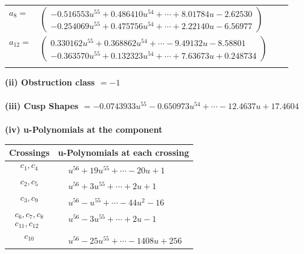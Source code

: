 \documentclass[1p]{elsarticle_modified}
\theoremstyle{definition}
\begin{document}
\begin{tabular}{m{7pt} m{180pt} m{7pt} m{180pt} }
\flushright $a_{8}=$&$\begin{pmatrix}-0.516553 u^{55}+0.486410 u^{54}+\cdots+8.01784 u-2.62530\\-0.254069 u^{55}+0.475756 u^{54}+\cdots+2.22140 u-6.56977\end{pmatrix}$ \\
\flushright $a_{12}=$&$\begin{pmatrix}0.330162 u^{55}+0.368862 u^{54}+\cdots-9.49132 u-8.58801\\-0.363570 u^{55}+0.132323 u^{54}+\cdots+7.63673 u+0.248734\end{pmatrix}$\\&\end{tabular}
\flushleft \textbf{(ii) Obstruction class $= -1$}\\~\\
\flushleft \textbf{(iii) Cusp Shapes $= -0.0743933 u^{55}-0.650973 u^{54}+\cdots-12.4637 u+17.4604$}\\~\\
\newpage\renewcommand{\arraystretch}{1}
\flushleft \textbf{(iv) u-Polynomials at the component}\newline \\
\begin{tabular}{m{50pt}|m{274pt}}
Crossings & \hspace{64pt}u-Polynomials at each crossing \\
\hline $$\begin{aligned}c_{1},c_{4}\end{aligned}$$&$\begin{aligned}
&u^{56}+19 u^{55}+\cdots-20 u+1
\end{aligned}$\\
\hline $$\begin{aligned}c_{2},c_{5}\end{aligned}$$&$\begin{aligned}
&u^{56}+3 u^{55}+\cdots+2 u+1
\end{aligned}$\\
\hline $$\begin{aligned}c_{3},c_{9}\end{aligned}$$&$\begin{aligned}
&u^{56}- u^{55}+\cdots-44 u^2-16
\end{aligned}$\\
\hline $$\begin{aligned}c_{6},c_{7},c_{8}\\c_{11},c_{12}\end{aligned}$$&$\begin{aligned}
&u^{56}-3 u^{55}+\cdots+2 u-1
\end{aligned}$\\
\hline $$\begin{aligned}c_{10}\end{aligned}$$&$\begin{aligned}
&u^{56}-25 u^{55}+\cdots-1408 u+256
\end{aligned}$\\
\hline
\end{tabular}\\~\\
\end{document}

